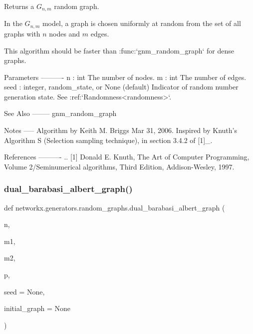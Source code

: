 \begin{DoxyVerb}Returns a $G_{n,m}$ random graph.

In the $G_{n,m}$ model, a graph is chosen uniformly at random from the set
of all graphs with $n$ nodes and $m$ edges.

This algorithm should be faster than :func:`gnm_random_graph` for dense
graphs.

Parameters
----------
n : int
    The number of nodes.
m : int
    The number of edges.
seed : integer, random_state, or None (default)
    Indicator of random number generation state.
    See :ref:`Randomness<randomness>`.

See Also
--------
gnm_random_graph

Notes
-----
Algorithm by Keith M. Briggs Mar 31, 2006.
Inspired by Knuth's Algorithm S (Selection sampling technique),
in section 3.4.2 of [1]_.

References
----------
.. [1] Donald E. Knuth, The Art of Computer Programming,
    Volume 2/Seminumerical algorithms, Third Edition, Addison-Wesley, 1997.
\end{DoxyVerb}
 \mbox{\label{namespacenetworkx_1_1generators_1_1random__graphs_adcdef09c96b457884a88ee782ada9b9c}} 
\subsubsection{\texorpdfstring{dual\+\_\+barabasi\+\_\+albert\+\_\+graph()}{dual\_barabasi\_albert\_graph()}}
{\footnotesize\ttfamily def networkx.\+generators.\+random\+\_\+graphs.\+dual\+\_\+barabasi\+\_\+albert\+\_\+graph (\begin{DoxyParamCaption}\item[{}]{n,  }\item[{}]{m1,  }\item[{}]{m2,  }\item[{}]{p,  }\item[{}]{seed = {\ttfamily None},  }\item[{}]{initial\+\_\+graph = {\ttfamily None} }\end{DoxyParamCaption})}

